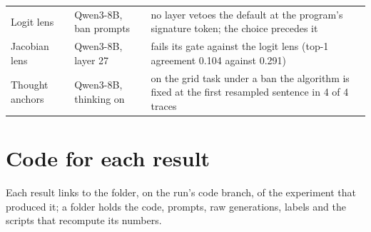 \documentclass[11pt,letterpaper]{article}
\begin{document}
\begin{table}[!htbp]
\begin{tabularx}{\linewidth}{@{}L{3.3cm}L{3.3cm}Y@{}}
Logit lens & Qwen3-8B, ban prompts & no layer vetoes the default at the program's signature token; the choice precedes it \\
Jacobian lens & Qwen3-8B, layer 27 & fails its gate against the logit lens (top-1 agreement 0.104 against 0.291) \\
Thought anchors & Qwen3-8B, thinking on & on the grid task under a ban the algorithm is fixed at the first resampled sentence in 4 of 4 traces \\
\bottomrule
\end{tabularx}
\end{table}

\section{Code for each result}
\label{app:code}

Each result links to the folder, on the run's code branch, of the experiment that produced it; a folder holds the code, prompts, raw generations, labels and the scripts that recompute its numbers.
\end{document}
